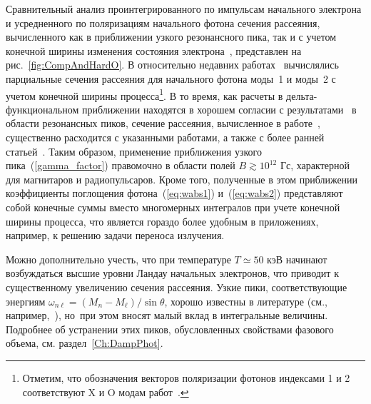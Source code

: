 Сравнительный анализ проинтегрированного по импульсам начального электрона и усредненного по поляризациям начального фотона сечения 
рассеяния, вычисленного как в приближении узкого резонансного пика, так и с 
учетом конечной ширины изменения состояния электрона~\cite{Harding:1991,SchwarmD:2017}, представлен на 
рис.~\ref{fig:CompAndHardO}. В относительно недавних работах~\cite{Mushtukov:2016,SchwarmD:2017} вычислялись 
парциальные сечения рассеяния для начального фотона моды~1 и моды~2 с учетом 
конечной ширины процесса\footnote{Отметим, что обозначения векторов поляризации фотонов индексами 1 и 2 соответствуют X и O модам работ~\cite{Mushtukov:2016,SchwarmD:2017}.}. В то время, как расчеты в дельта-функциональном 
приближении находятся в хорошем согласии с 
результатами~\cite{Harding:1991,SchwarmD:2017} в области резонансных пиков, 
сечение рассеяния, вычисленное в работе~\cite{Mushtukov:2016}, существенно 
расходится с указанными работами, а также с более ранней статьей~\cite{Mushtukov:2015}. Таким образом, применение 
приближения узкого пика~(\ref{gamma_factor}) правомочно  в области полей $B \gtrsim 10^{12}$ Гс, характерной для магнитаров и радиопульсаров. Кроме того, 
полученные в этом приближении коэффициенты поглощения фотона~(\ref{eq:wabs1}) 
и~(\ref{eq:wabs2}) представляют собой конечные суммы вместо многомерных интегралов при учете 
конечной ширины процесса, что является гораздо более 
удобным в приложениях, например, к решению задачи переноса излучения.

Можно дополнительно учесть, что при температуре $T\simeq 50$ кэВ начинают 
возбуждаться высшие уровни Ландау начальных электронов, что приводит к 
существенному 
увеличению  сечения рассеяния. Узкие пики, соответствующие 
энергиям $\omega_{n\ell}=(M_n-M_\ell)/\sin \theta$, хорошо известны в 
литературе (см., 
например,~\cite{Pavlov:1991,Klepikov:1954,Baier:2007}), но~при этом вносят 
малый вклад в 
интегральные 
величины. Подробнее об устранении этих пиков, обусловленных свойствами фазового 
объема, см. раздел~\ref{Ch:DampPhot}.

